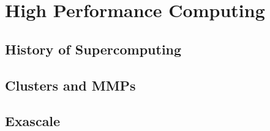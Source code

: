\section{High Performance Computing}
\label{sec:hpc}


\subsection{History of Supercomputing}



\subsection{Clusters and MMPs}


\subsection{Exascale}


